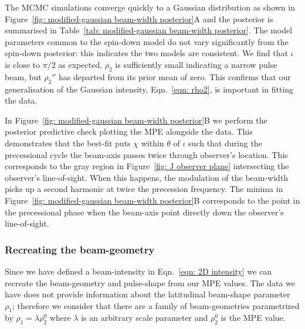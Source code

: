 \documentclass[../full_thesis/full_thesis.tex]{subfiles}
\newcommand{\thisdir}{../comparing_periodic_modulations}
\newcommand{\bigfigurecaptions}[2]{
$\textbf{A}$: The estimated marginal posterior probability distribution for the
#1 #2 model parameters. $\textbf{B}$: Checking the fit of the model using the
maximum posterior values to the data; see Figure~\ref{fig: noise-only beam-width
posterior fit} for a complete description.}
\begin{document}
The MCMC simulations converge quickly to a Gaussian distribution as shown in
Figure~\ref{fig: modified-gaussian beam-width posterior}A and the posterior is
summarised in Table~\ref{tab: modified-gaussian beam-width posterior}. The model parameters
common to the spin-down model do not vary significantly from the spin-down
posterior: this indicates the two models are consistent. We find that $\iota$
is close to $\pi/2$ as expected, $\rho_2$ is sufficiently small indicating a
narrow pulse beam, but $\rho_2''$ has departed from its prior mean of zero.
This confirms that our generalisation of the Gaussian intensity,
Eqn.~\eqref{eqn: rho2}, is important in fitting the data.
\begin{figure*}
\centering
\texttt{[image: \{Beamwidth\_ModifiedGaussian\_0.1\_PosteriorWithFit]}.pdf}
\caption{\bigfigurecaptions{modified-Gaussian precession}{beam-width}}
\label{fig: modified-gaussian beam-width posterior}
\end{figure*}
\begin{table}
\centering
\caption{Posterior estimates for the beam-width modified-Gaussian precession model.}
\label{tab: modified-gaussian beam-width posterior}

\end{table}

In Figure~\ref{fig: modified-gaussian beam-width posterior}B we perform the
posterior predictive check plotting the MPE alongside the data.  This
demonstrates that the best-fit puts $\chi$ within $\theta$ of $\iota$ such that
during the precessional cycle the beam-axis passes twice through observer's
location. This corresponds to the gray region in Figure~\ref{fig: J observer
plane} intersecting the observer's line-of-sight. When this happens, the
modulation of the beam-width picks up a second harmonic at twice the precession
frequency. The minima in Figure~\ref{fig: modified-gaussian beam-width
posterior}B corresponds to the point in the precessional phase when the
beam-axis point directly down the observer's line-of-sight.



\subsubsection{Recreating the beam-geometry}
\label{sec: recreating the beam-geometry}

Since we have defined a beam-intensity in Eqn.~\eqref{eqn: 2D intensity} we can
recreate the beam-geometry and pulse-shape from our MPE values.  The data we
have does not provide information about the latitudinal beam-shape parameter
$\rho_1$; therefore we consider that there are a family of beam-geometries
parametrized by $\rho_1 = \lambda \rho_2^0$ where $\lambda$ is an arbitrary
scale parameter and $\rho_2^0$ is the MPE value.
\end{document}
